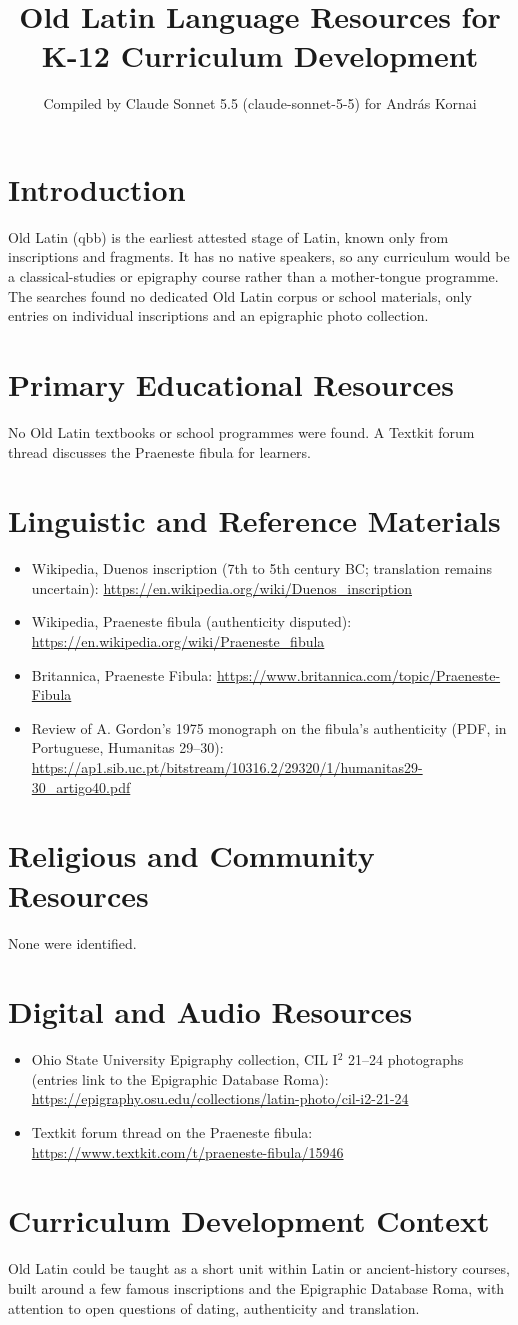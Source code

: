 \documentclass[12pt]{article}
\title{Old Latin Language Resources for K-12 Curriculum Development}
\author{Compiled by Claude Sonnet 5.5 (claude-sonnet-5-5) for Andr\'as Kornai}
\date{}
\begin{document}
\maketitle

\section{Introduction}
Old Latin (qbb) is the earliest attested stage of Latin, known only from inscriptions and fragments. It has no native speakers, so any curriculum would be a classical-studies or epigraphy course rather than a mother-tongue programme. The searches found no dedicated Old Latin corpus or school materials, only entries on individual inscriptions and an epigraphic photo collection.

\section{Primary Educational Resources}
No Old Latin textbooks or school programmes were found. A Textkit forum thread discusses the Praeneste fibula for learners.

\section{Linguistic and Reference Materials}
\begin{itemize}
\item Wikipedia, Duenos inscription (7th to 5th century BC; translation remains uncertain): \url{https://en.wikipedia.org/wiki/Duenos_inscription}
\item Wikipedia, Praeneste fibula (authenticity disputed): \url{https://en.wikipedia.org/wiki/Praeneste_fibula}
\item Britannica, Praeneste Fibula: \url{https://www.britannica.com/topic/Praeneste-Fibula}
\item Review of A. Gordon's 1975 monograph on the fibula's authenticity (PDF, in Portuguese, Humanitas 29--30): \url{https://ap1.sib.uc.pt/bitstream/10316.2/29320/1/humanitas29-30_artigo40.pdf}
\end{itemize}

\section{Religious and Community Resources}
None were identified.

\section{Digital and Audio Resources}
\begin{itemize}
\item Ohio State University Epigraphy collection, CIL I$^2$ 21--24 photographs (entries link to the Epigraphic Database Roma): \url{https://epigraphy.osu.edu/collections/latin-photo/cil-i2-21-24}
\item Textkit forum thread on the Praeneste fibula: \url{https://www.textkit.com/t/praeneste-fibula/15946}
\end{itemize}

\section{Curriculum Development Context}
Old Latin could be taught as a short unit within Latin or ancient-history courses, built around a few famous inscriptions and the Epigraphic Database Roma, with attention to open questions of dating, authenticity and translation.
\end{document}
